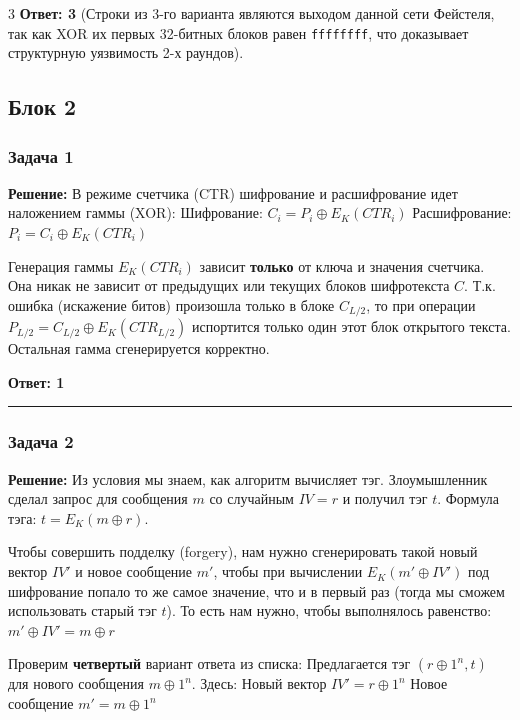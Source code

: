 ﻿\documentclass[9pt,a4paper,landscape]{extarticle}
\begin{document}
\begin{multicols*}{3}
\textbf{Ответ: 3} (Строки из 3-го варианта являются выходом данной сети Фейстеля, так как XOR их первых 32-битных блоков равен \texttt{ffffffff}, что доказывает структурную уязвимость 2-х раундов).

\subsection{Блок 2}\label{ux431ux43bux43eux43a-2}

\subsubsection{Задача 1}\label{ux437ux430ux434ux430ux447ux430-1}

\textbf{Решение:} В режиме счетчика (CTR) шифрование и расшифрование идет наложением гаммы (XOR): Шифрование: \(C_i = P_i \oplus E_K(CTR_i)\) Расшифрование: \(P_i = C_i \oplus E_K(CTR_i)\)

Генерация гаммы \(E_K(CTR_i)\) зависит \textbf{только} от ключа и значения счетчика. Она никак не зависит от предыдущих или текущих блоков шифротекста \(C\). Т.к. ошибка (искажение битов) произошла только в блоке \(C_{L/2}\), то при операции \(P_{L/2} = C_{L/2} \oplus E_K(CTR_{L/2})\) испортится только один этот блок открытого текста. Остальная гамма сгенерируется корректно.

\textbf{Ответ: 1}

\begin{center}\rule{0.5\linewidth}{0.5pt}\end{center}

\subsubsection{Задача 2}\label{ux437ux430ux434ux430ux447ux430-2}

\textbf{Решение:} Из условия мы знаем, как алгоритм вычисляет тэг. Злоумышленник сделал запрос для сообщения \(m\) со случайным \(IV = r\) и получил тэг \(t\). Формула тэга: \(t = E_K(m \oplus r)\).

Чтобы совершить подделку (forgery), нам нужно сгенерировать такой новый вектор \(IV'\) и новое сообщение \(m'\), чтобы при вычислении \(E_K(m' \oplus IV')\) под шифрование попало то же самое значение, что и в первый раз (тогда мы сможем использовать старый тэг \(t\)). То есть нам нужно, чтобы выполнялось равенство: \(m' \oplus IV' = m \oplus r\)

Проверим \textbf{четвертый} вариант ответа из списка: Предлагается тэг \textbf{\((r \oplus 1^n, t)\)} для нового сообщения \textbf{\(m \oplus 1^n\)}. Здесь: Новый вектор \(IV' = r \oplus 1^n\) Новое сообщение \(m' = m \oplus 1^n\)


\end{multicols*}
\end{document}
